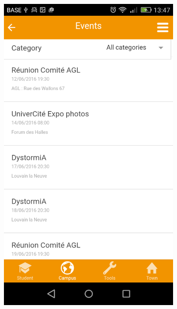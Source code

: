 \documentclass{eplmastersthesis}
\begin{document}
\begin{figure}
\begin{subfigure}[b]{0.3\textwidth}
        \includegraphics[width=\textwidth]{Images/Application_screens/Screenshot_2016-06-06-13-47-19.png}
    \end{subfigure}
    ~ %
    \begin{subfigure}[b]{0.3\textwidth}

\end{subfigure}
\end{figure}
\end{document}
